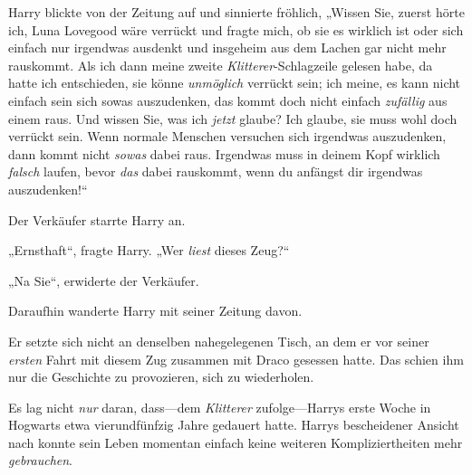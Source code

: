 Harry blickte von der Zeitung auf und sinnierte fröhlich, „Wissen Sie, zuerst hörte ich, Luna Lovegood wäre verrückt und fragte mich, ob sie es wirklich ist oder sich einfach nur irgendwas ausdenkt und insgeheim aus dem Lachen gar nicht mehr rauskommt. Als ich dann meine zweite \emph{Klitterer}-Schlagzeile gelesen habe, da hatte ich entschieden, sie könne \emph{unmöglich} verrückt sein; ich meine, es kann nicht einfach sein sich sowas auszudenken, das kommt doch nicht einfach \emph{zufällig} aus einem raus. Und wissen Sie, was ich \emph{jetzt} glaube? Ich glaube, sie muss wohl doch verrückt sein. Wenn normale Menschen versuchen sich irgendwas auszudenken, dann kommt nicht \emph{sowas} dabei raus. Irgendwas muss in deinem Kopf wirklich \emph{falsch} laufen, bevor \emph{das} dabei rauskommt, wenn du anfängst dir irgendwas auszudenken!“

Der Verkäufer starrte Harry an.

„Ernsthaft“, fragte Harry. „Wer \emph{liest} dieses Zeug?“

„Na Sie“, erwiderte der Verkäufer.

Daraufhin wanderte Harry mit seiner Zeitung davon.

Er setzte sich nicht an denselben nahegelegenen Tisch, an dem er vor seiner \emph{ersten} Fahrt mit diesem Zug zusammen mit Draco gesessen hatte. Das schien ihm nur die Geschichte zu provozieren, sich zu wiederholen.

Es lag nicht \emph{nur} daran, dass—dem \emph{Klitterer} zufolge—Harrys erste Woche in Hogwarts etwa vierundfünfzig Jahre gedauert hatte. Harrys bescheidener Ansicht nach konnte sein Leben momentan einfach keine weiteren Kompliziertheiten mehr \emph{gebrauchen}.

